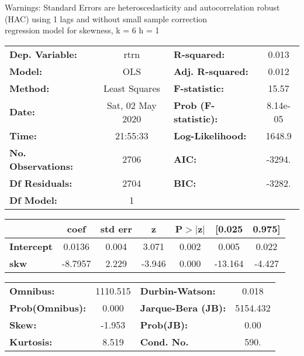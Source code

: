 Warnings: \newline
 [1] Standard Errors are heteroscedasticity and autocorrelation robust (HAC) using 1 lags and without small sample correction\\ 

regression model for skewness, k = 6 h = 1\begin{center}
\begin{tabular}{lclc}
\toprule
\textbf{Dep. Variable:}    &       rtrn       & \textbf{  R-squared:         } &     0.013   \\
\textbf{Model:}            &       OLS        & \textbf{  Adj. R-squared:    } &     0.012   \\
\textbf{Method:}           &  Least Squares   & \textbf{  F-statistic:       } &     15.57   \\
\textbf{Date:}             & Sat, 02 May 2020 & \textbf{  Prob (F-statistic):} &  8.14e-05   \\
\textbf{Time:}             &     21:55:33     & \textbf{  Log-Likelihood:    } &    1648.9   \\
\textbf{No. Observations:} &        2706      & \textbf{  AIC:               } &    -3294.   \\
\textbf{Df Residuals:}     &        2704      & \textbf{  BIC:               } &    -3282.   \\
\textbf{Df Model:}         &           1      & \textbf{                     } &             \\
\bottomrule
\end{tabular}
\begin{tabular}{lcccccc}
                   & \textbf{coef} & \textbf{std err} & \textbf{z} & \textbf{P$> |$z$|$} & \textbf{[0.025} & \textbf{0.975]}  \\
\midrule
\textbf{Intercept} &       0.0136  &        0.004     &     3.071  &         0.002        &        0.005    &        0.022     \\
\textbf{skw}       &      -8.7957  &        2.229     &    -3.946  &         0.000        &      -13.164    &       -4.427     \\
\bottomrule
\end{tabular}
\begin{tabular}{lclc}
\textbf{Omnibus:}       & 1110.515 & \textbf{  Durbin-Watson:     } &    0.018  \\
\textbf{Prob(Omnibus):} &   0.000  & \textbf{  Jarque-Bera (JB):  } & 5154.432  \\
\textbf{Skew:}          &  -1.953  & \textbf{  Prob(JB):          } &     0.00  \\
\textbf{Kurtosis:}      &   8.519  & \textbf{  Cond. No.          } &     590.  \\
\bottomrule
\end{tabular}
\end{center}

